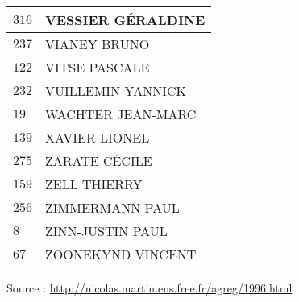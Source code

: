 \begin{xltabular}{\linewidth}{|l|X|}
    \hline
    $316$ & VESSIER GÉRALDINE \\
    \hline
    $237$ & VIANEY BRUNO \\
    \hline
    $122$ & VITSE PASCALE \\
    \hline
    $232$ & VUILLEMIN YANNICK \\
    \hline
    $19$ & WACHTER JEAN-MARC \\
    \hline
    $139$ & XAVIER LIONEL \\
    \hline
    $275$ & ZARATE CÉCILE \\
    \hline
    $159$ & ZELL THIERRY \\
    \hline
    $256$ & ZIMMERMANN PAUL \\
    \hline
    $8$ & ZINN-JUSTIN PAUL \\
    \hline
    $67$ & ZOONEKYND VINCENT \\
    \hline
  \end{xltabular}

  \begin{flushright}
    {\tiny Source : \url{http://nicolas.martin.ens.free.fr/agreg/1996.html}}
  \end{flushright}

